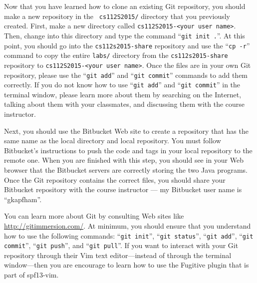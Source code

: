 Now that you have learned how to clone an existing Git repository, you should make a new repository in the {\tt
  cs112S2015/} directory that you previously created.  First, make a new directory called {\tt cs112S2015-<your user
  name>}. Then, change into this directory and type the command ``{\tt git init .}''.  At this point, you should go into
the {\tt cs112s2015-share} repository and use the ``{\tt cp -r}'' command to copy the entire {\tt labs/} directory from
the {\tt cs112s2015-share} repository to {\tt cs112S2015-<your user name>}.  Once the files are in your own Git
repository, please use the ``{\tt git add}'' and ``{\tt git commit}'' commands to add them correctly. If you do not know
how to use ``{\tt git add}'' and ``{\tt git commit}'' in the terminal window, please learn more about them by searching
on the Internet, talking about them with your classmates, and discussing them with the course instructor.

Next, you should use the Bitbucket Web site to create a repository that has the same name as the local directory and
local repository.  You must follow Bitbucket's instructions to push the code and tags in your local repository to the
remote one. When you are finished with this step, you should see in your Web browser that the Bitbucket servers are
correctly storing the two Java programs. Once the Git repository contains the correct files, you should share your Bitbucket
repository with the course instructor --- my Bitbucket user name is ``gkapfham''.

You can learn more about Git by consulting Web sites like  \url{http://gitimmersion.com/}.  At minimum, you should
ensure that you understand how to use the following commands: ``{\tt git init}'', ``{\tt git status}'', ``{\tt git
  add}'', ``{\tt git commit}'', ``{\tt git push}'', and ``{\tt git pull}''. If you want to interact with your Git
repository through their Vim text editor---instead of through the terminal window---then you are encourage to learn how
to use the Fugitive plugin that is part of spf13-vim.



